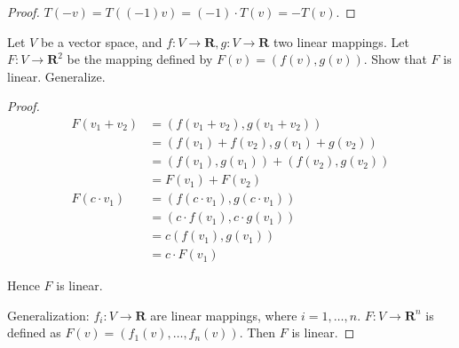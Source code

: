 \begin{proof}
    $T(-v) = T((-1)v) = (-1)\cdot T(v) = -T(v)$.
\end{proof}

\begin{exercise}
    Let $V$ be a vector space, and $f: V \to \mathbf{R}, g: V \to \mathbf{R}$ two linear mappings. Let $F: V \to \mathbf{R}^{2}$ be the mapping defined by $F(v) = (f(v), g(v))$. Show that $F$ is linear. Generalize.
\end{exercise}

\begin{proof}
    \begin{align*}
        F(v_{1} + v_{2}) & = (f(v_{1} + v_{2}), g(v_{1} + v_{2}))        \\
                         & = (f(v_{1}) + f(v_{2}), g(v_{1}) + g(v_{2}))  \\
                         & = (f(v_{1}), g(v_{1})) + (f(v_{2}), g(v_{2})) \\
                         & = F(v_{1}) + F(v_{2})                         \\
        F(c\cdot v_{1})  & = (f(c\cdot v_{1}), g(c\cdot v_{1}))          \\
                         & = (c\cdot f(v_{1}), c\cdot g(v_{1}))          \\
                         & = c(f(v_{1}), g(v_{1}))                       \\
                         & = c\cdot F(v_{1})
    \end{align*}

    Hence $F$ is linear.

    Generalization: $f_{i}: V \to \mathbf{R}$ are linear mappings, where $i = 1, \ldots, n$. $F: V \to \mathbf{R}^{n}$ is defined as $F(v) = (f_{1}(v), \ldots, f_{n}(v))$. Then $F$ is linear.


\end{proof}
